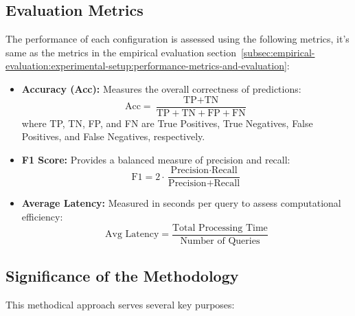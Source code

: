 \subsection{Evaluation Metrics}\label{subsec:ablation-metrics}
The performance of each configuration is assessed using the following metrics, it's same as the metrics in the empirical evaluation section~\ref{subsec:empirical-evaluation:experimental-setup:performance-metrics-and-evaluation}:

\begin{itemize}
    \item \textbf{Accuracy (Acc):} Measures the overall correctness of predictions:
    \begin{equation}
        \text{Acc} = \frac{\text{TP} + \text{TN}}{\text{TP} + \text{TN} + \text{FP} + \text{FN}}
    \end{equation}
    where TP, TN, FP, and FN are True Positives, True Negatives, False Positives, and False Negatives, respectively.

    \item \textbf{F1 Score:} Provides a balanced measure of precision and recall:
    \begin{equation}
        \text{F1} = 2 \cdot \frac{\text{Precision} \cdot \text{Recall}}{\text{Precision} + \text{Recall}}
    \end{equation}


    \item \textbf{Average Latency:} Measured in seconds per query to assess computational efficiency:
    \begin{equation}
        \text{Avg Latency} = \frac{\text{Total Processing Time}}{\text{Number of Queries}}
    \end{equation}
\end{itemize}

\subsection{Significance of the Methodology}\label{subsec:significance-of-the-methodology}
This methodical approach serves several key purposes:

